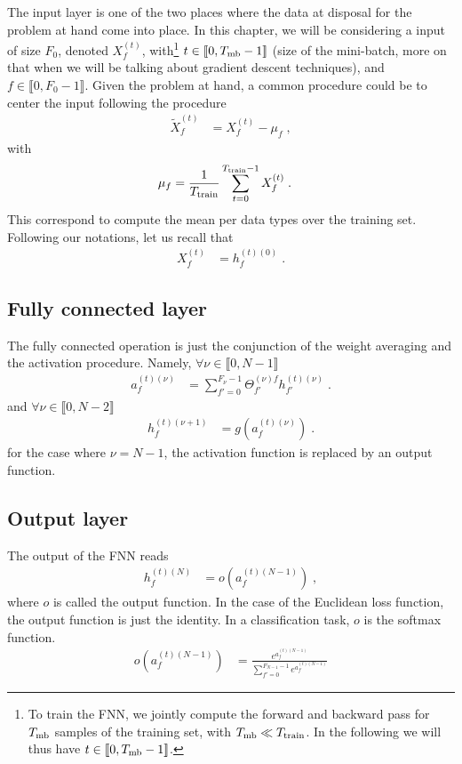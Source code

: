 The input layer is one of the two places where the data at disposal for the problem at hand come into place. In this chapter, we will be considering a input of size $F_0$, denoted $X^{(t)}_{f}$, with\footnote{
To train the FNN, we jointly compute the forward and backward pass for $T_{{\rm mb}}$ samples of the training set, with $T_{{\rm mb}}\ll T_{{\rm train}}$. In the following we will thus have $t\in \llbracket 0, T_{{\rm mb}}-1\rrbracket$.
}
 $t\in \llbracket 0, T_{{\rm mb}}-1\rrbracket$ (size of the  mini-batch, more on that when we will be talking about gradient descent techniques), and $f \in \llbracket 0, F_0-1\rrbracket$. Given the problem at hand, a common procedure could be to center the input following the procedure
\begin{align}
\tilde{X}^{(t)}_{f}&=X^{(t)}_{f}-\mu_{f}\;,
\end{align}
with
\begin{align}
\mu_{f}&=\frac{1}{T_{{\rm train}}}\sum^{T_{{\rm train}}-1}_{t=0}X^{(t)}_{f}\;.
\end{align}
This correspond to compute the mean per data types over the training set. Following our notations, let us recall that
\begin{align}
X^{(t)}_{f}&=h^{(t)(0)}_{f}\;.
\end{align}

\subsection{Fully connected  layer}

The fully connected operation is just the conjunction of the weight averaging and the activation procedure. Namely, $\forall \nu\in \llbracket 0,N-1 \rrbracket$
\begin{align}
a_{f}^{(t)(\nu)}&=\sum^{F_\nu-1}_{f'=0}\Theta^{(\nu)f}_{f'}h^{(t)(\nu)}_{f'}\;.\label{eq:Weightavg}
\end{align}
and $\forall \nu\in \llbracket 0,N-2 \rrbracket$
\begin{align}
h_{f}^{(t)(\nu+1)}&=g\left(a_{f}^{(t)(\nu)}\right)\;.
\end{align}
for the case where $\nu=N-1$, the activation function is replaced by an output function.



\subsection{Output layer}

The output of the FNN reads
 \begin{align}
h_{f}^{(t)(N)}&=o(a_{f}^{(t)(N-1)})\;,
\end{align}
where $o$ is called the output function. In the case of the Euclidean loss function, the output function is just the identity. In a classification task, $o$ is the softmax function.
\begin{align}
o\left(a^{(t)(N-1)}_f\right)&=\frac{e^{a^{(t)(N-1)}_f}}{\sum\limits^{F_{N-1}-1}_{f'=0}e^{a^{(t)(N-1)}_{f'}}}
\end{align}



